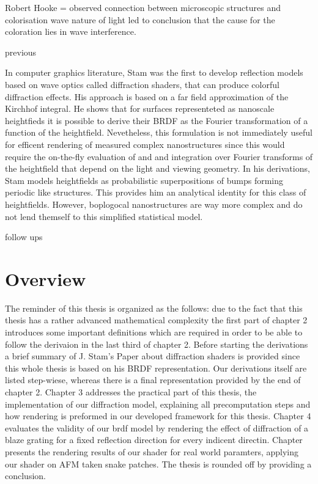 Robert Hooke = observed connection between microscopic structures and colorisation
wave nature of light led to conclusion that the cause for the coloration lies in wave interference.

previous

In computer graphics literature, Stam was the first to develop reflection models based on wave optics called diffraction shaders, that can produce colorful diffraction effects. His approach is based on a far field approximation of the Kirchhof integral. He shows that for surfaces representeted as nanoscale heightfieds it is possible to derive their BRDF as the Fourier transformation of a function of the heightfield. Nevetheless, this formulation is not immediately useful for efficent rendering of measured complex nanostructures since this would require the on-the-fly evaluation of and and integration over Fourier transforms of the heightfield that depend on the light and viewing geometry. In his derivations, Stam models heightfields as probabilistic superpositions of bumps forming periodic like structures. This provides him an analytical identity for this class of heightfields. However, boplogocal nanostructures are way more complex and do not lend themself to this simplified statistical model.

follow ups


\section{Overview}
The reminder of this thesis is organized as the follows: due to the fact that this thesis has a rather advanced mathematical complexity the first part of chapter 2 introduces some important definitions which are required in order to be able to follow the derivaion in the last third of chapter 2. Before starting the derivations a brief summary of J. Stam's Paper about diffraction shaders is provided since this whole thesis is based on his BRDF representation. Our derivations itself are listed step-wiese, whereas there is a final representation provided by the end of chapter 2. Chapter 3 addresses the practical part of this thesis, the implementation of our diffraction model, explaining all precomputation steps and how rendering is preformed in our developed framework for this thesis. Chapter 4 evaluates the validity of our brdf model by rendering the effect of diffraction of a blaze grating for a fixed reflection direction for every indicent directin. Chapter presents the rendering results of our shader for real world paramters, applying our shader on AFM taken snake patches. The thesis is rounded off by providing a conclusion.    



